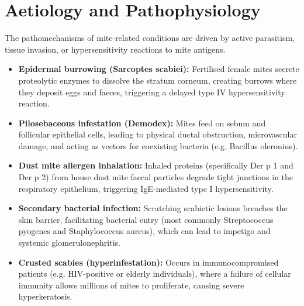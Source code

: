 \section*{Aetiology and Pathophysiology}
The pathomechanisms of mite-related conditions are driven by active parasitism, tissue invasion, or hypersensitivity reactions to mite antigens.
\begin{itemize}
    \item \textbf{Epidermal burrowing (Sarcoptes scabiei):} Fertilised female mites secrete proteolytic enzymes to dissolve the stratum corneum, creating burrows where they deposit eggs and faeces, triggering a delayed type IV hypersensitivity reaction.
    \item \textbf{Pilosebaceous infestation (Demodex):} Mites feed on sebum and follicular epithelial cells, leading to physical ductal obstruction, microvascular damage, and acting as vectors for coexisting bacteria (e.g. Bacillus oleronius).
    \item \textbf{Dust mite allergen inhalation:} Inhaled proteins (specifically Der p 1 and Der p 2) from house dust mite faecal particles degrade tight junctions in the respiratory epithelium, triggering IgE-mediated type I hypersensitivity.
    \item \textbf{Secondary bacterial infection:} Scratching scabietic lesions breaches the skin barrier, facilitating bacterial entry (most commonly Streptococcus pyogenes and Staphylococcus aureus), which can lead to impetigo and systemic glomerulonephritis.
    \item \textbf{Crusted scabies (hyperinfestation):} Occurs in immunocompromised patients (e.g. HIV-positive or elderly individuals), where a failure of cellular immunity allows millions of mites to proliferate, causing severe hyperkeratosis.
\end{itemize}

